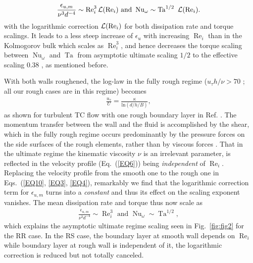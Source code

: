 \documentclass[aps,prl,superscriptaddress,preprint]{revtex4}
\renewcommand{\Re}{\operatorname{Re}}
\newcommand{\Ta}{\operatorname{Ta}}
\newcommand{\Nu}{\operatorname{Nu}_{\omega}}
\begin{document}
 \begin{eqnarray}\label{EQ5}
\frac{\epsilon_{u,m}}{\nu^3d^{-4}} \sim \Re_i^3 {\cal{L}}(\Re_i)  \,\, \mathrm{and} \,\, \Nu \sim \Ta^{1/2}\ {\cal{L}}(\Re_i).                                                                       
\end{eqnarray}
with the logarithmic correction ${\cal{L}}(\Re_i)$ for both dissipation rate and torque scalings. It leads to a less steep increase of $\epsilon_u$ with increasing $\Re_i$ than in the Kolmogorov bulk which scales as $\Re_i^3$, and hence decreases the torque scaling between $\Nu$ and $\Ta$ from asymptotic ultimate scaling $1/2$ to the effective scaling 0.38 \cite{gro11,gil11,he12}, as mentioned before.  

With both walls roughened, the log-law in the fully rough regime ($u_\tau h/\nu>70$ \cite{sch00}; all our rough cases are in this regime) becomes
 \begin{eqnarray}\label{EQ6}
\frac{u_\tau}{U}=\frac{\kappa}{\mathrm{ln}(d/h/B)},                                                                    
\end{eqnarray}
as shown for turbulent TC flow with one rough boundary layer in Ref. \cite{zhu17}.  The momentum transfer between the wall and the fluid is accomplished by the shear, which in the fully rough regime occurs predominantly by the pressure forces on the side surfaces of the rough elements, rather than by viscous forces \cite{pop00}. That in the ultimate regime the kinematic viscosity $\nu$ is an irrelevant parameter, is reflected in the velocity profile (Eq.~(\ref{EQ6})) being  {\it{independent}} of $\Re_i$. Replacing the velocity profile from the smooth one to the rough one in Eqs.~(\ref{EQ10}, \ref{EQ3}, \ref{EQ4}), remarkably we find that the logarithmic correction term for $\epsilon_{u,m}$ turns into a \textit{constant} and thus its effect on the scaling exponent vanishes. The mean dissipation rate and torque thus now scale as
 \begin{eqnarray}\label{EQ7}
\frac{\epsilon_{u,m}}{\nu^3d^{-4}} \sim \Re_i^3  \,\, \mathrm{and} \,\, \Nu \sim \Ta^{1/2},                                                                       
\end{eqnarray}     
which explains the asymptotic ultimate regime scaling seen in Fig.~\ref{fig:fig2} for the RR case. In the RS case, the boundary layer at smooth wall depends on $\Re_i$ while boundary layer at rough wall is independent of it, the logarithmic correction is reduced but not totally canceled.  
\end{document}
